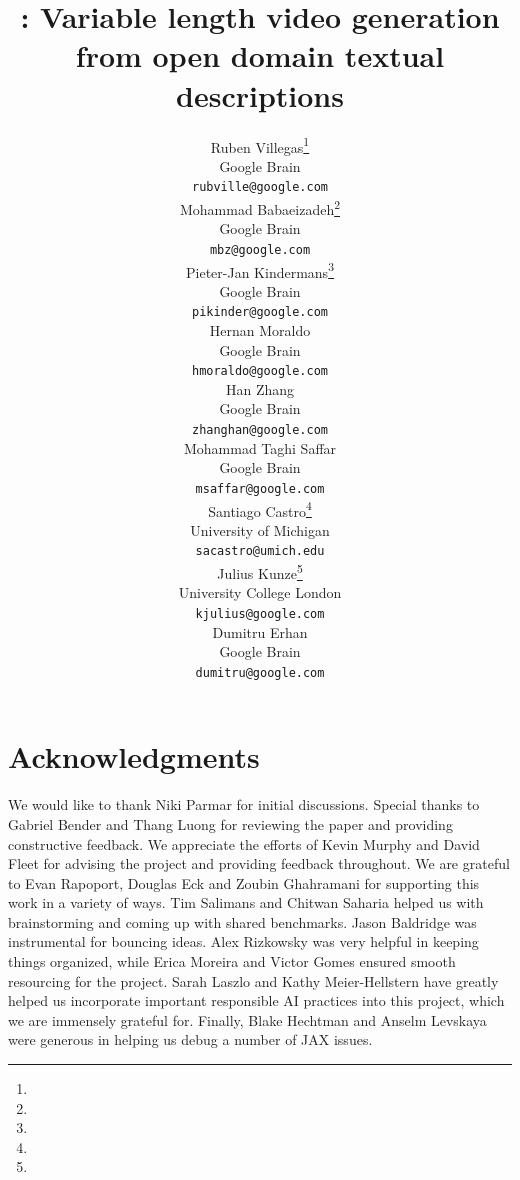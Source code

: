 \documentclass{article} %
\title{\model: Variable length video generation\\from open domain textual descriptions}
\author{
Ruben Villegas\footnote[3]{}\\
Google Brain \\
\small{\texttt{rubville@google.com}} \\
\And
Mohammad Babaeizadeh\footnote[3]{}\\
Google Brain \\
\small{\texttt{mbz@google.com}} \\
\And
Pieter-Jan Kindermans\footnote[3]{}\\
Google Brain \\
\small{\texttt{pikinder@google.com}} \\
\AND
Hernan Moraldo\\
Google Brain \\
\small{\texttt{hmoraldo@google.com}} \\
\And
Han Zhang\\
Google Brain \\
\small{\texttt{zhanghan@google.com}} \\
\And
Mohammad Taghi Saffar\\
Google Brain \\
\small{\texttt{msaffar@google.com}} \\
\AND
Santiago Castro\footnote[1]{}\\
University of Michigan \\
\small{\texttt{sacastro@umich.edu}} \\
\And
Julius Kunze\footnote[1]{}\\
University College London \\
\small{\texttt{kjulius@google.com}} \\
\And
Dumitru Erhan\\
Google Brain \\
\small{\texttt{dumitru@google.com}} \\
\AND
}
\begin{document}
\maketitle
{}










\section*{Acknowledgments}
We would like to thank Niki Parmar for initial discussions. Special thanks to Gabriel Bender and Thang Luong for reviewing the paper and providing constructive feedback. We appreciate the efforts of Kevin Murphy and David Fleet for advising the project and providing feedback throughout. We are grateful to Evan Rapoport, Douglas Eck and Zoubin Ghahramani for supporting this work in a variety of ways. Tim Salimans and Chitwan Saharia helped us with brainstorming and coming up with shared benchmarks. Jason Baldridge was instrumental for bouncing ideas. Alex Rizkowsky was very helpful in keeping things organized, while Erica Moreira and Victor Gomes ensured smooth resourcing for the project. Sarah Laszlo and Kathy Meier-Hellstern have greatly helped us incorporate important responsible AI practices into this project, which we are immensely grateful for. Finally, Blake Hechtman and Anselm Levskaya were generous in helping us debug a number of JAX issues.


% 


\newpage
\appendix

\end{document}
